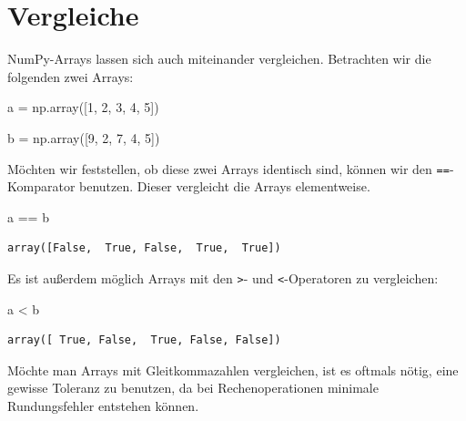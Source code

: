 \documentclass[
  letterpaper,
  DIV=11,
  numbers=noendperiod]{scrreprt}
\newenvironment{Shaded}{\begin{snugshade}}{\end{snugshade}}
\newcommand{\DecValTok}[1]{\textcolor[rgb]{0.68,0.00,0.00}{#1}}
\newcommand{\NormalTok}[1]{\textcolor[rgb]{0.00,0.23,0.31}{#1}}
\newcommand{\OperatorTok}[1]{\textcolor[rgb]{0.37,0.37,0.37}{#1}}
\begin{document}
\section{Vergleiche}\label{vergleiche}

NumPy-Arrays lassen sich auch miteinander vergleichen. Betrachten wir
die folgenden zwei Arrays:

\begin{Shaded}
\begin{Highlighting}[]
\NormalTok{a }\OperatorTok{=}\NormalTok{ np.array([}\DecValTok{1}\NormalTok{, }\DecValTok{2}\NormalTok{, }\DecValTok{3}\NormalTok{, }\DecValTok{4}\NormalTok{, }\DecValTok{5}\NormalTok{])}

\NormalTok{b }\OperatorTok{=}\NormalTok{ np.array([}\DecValTok{9}\NormalTok{, }\DecValTok{2}\NormalTok{, }\DecValTok{7}\NormalTok{, }\DecValTok{4}\NormalTok{, }\DecValTok{5}\NormalTok{])}
\end{Highlighting}
\end{Shaded}

Möchten wir feststellen, ob diese zwei Arrays identisch sind, können wir
den \texttt{==}-Komparator benutzen. Dieser vergleicht die Arrays
elementweise.

\begin{Shaded}
\begin{Highlighting}[]
\NormalTok{a }\OperatorTok{==}\NormalTok{ b}
\end{Highlighting}
\end{Shaded}

\begin{verbatim}
array([False,  True, False,  True,  True])
\end{verbatim}

Es ist außerdem möglich Arrays mit den \texttt{\textgreater{}}- und
\texttt{\textless{}}-Operatoren zu vergleichen:

\begin{Shaded}
\begin{Highlighting}[]
\NormalTok{a }\OperatorTok{\textless{}}\NormalTok{ b}
\end{Highlighting}
\end{Shaded}

\begin{verbatim}
array([ True, False,  True, False, False])
\end{verbatim}

Möchte man Arrays mit Gleitkommazahlen vergleichen, ist es oftmals
nötig, eine gewisse Toleranz zu benutzen, da bei Rechenoperationen
minimale Rundungsfehler entstehen können.
\end{document}
